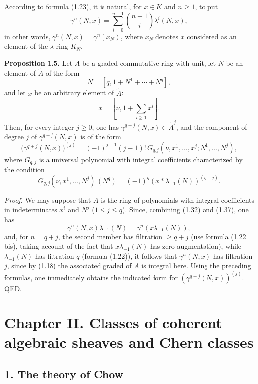 According to formula (1.23), it is natural, for $x\in K$ and $n\geq 1$, to put
\begin{equation}\tag{1.37}
\gamma^n(N,x)=\sum_{i=0}^{n-1}\binom{n-1}{i}\lambda^i(N,x),
\end{equation}
in other words, $\gamma^n(N,x)=\gamma^n(x_N)$, where $x_N$ denotes $x$ considered as an element of the $\lambda$-ring $K_N$.

\textbf{Proposition 1.5.} Let $A$ be a graded commutative ring with unit, let $N$ be an element of $\widetilde A$ of the form
\[
N=[q,1+N^1+\cdots+N^q],
\]
and let $x$ be an arbitrary element of $\widetilde A$:
\[
x=[\nu,1+\sum_{i\geq 1}x^i].
\]
Then, for every integer $j\geq 0$, one has $\gamma^{q+j}(N,x)\in\widetilde A^j$, and the component of degree $j$ of $\gamma^{q+j}(N,x)$ is of the form
\begin{equation}\tag{1.38}
\bigl(\gamma^{q+j}(N,x)\bigr)^{(j)}=(-1)^{j-1}(j-1)!\,G_{q,j}(\nu,x^1,\ldots,x^j;N^1,\ldots,N^j),
\end{equation}
where $G_{q,j}$ is a universal polynomial with integral coefficients characterized by the condition
\begin{equation}\tag{1.39}
G_{q,j}(\nu,x^1,\ldots,N^j)\,(N^q)=(-1)^q(x*\lambda_{-1}(N))^{(q+j)}.
\end{equation}

\emph{Proof.} We may suppose that $A$ is the ring of polynomials with integral coefficients in indeterminates $x^i$ and $N^j$ ($1\leq j\leq q$). Since, combining (1.32) and (1.37), one has
\begin{equation}\tag{1.40}
\gamma^n(N,x)\lambda_{-1}(N)=\gamma^n(x\lambda_{-1}(N)),
\end{equation}
and, for $n=q+j$, the second member has filtration $\geq q+j$ (use formula (1.22 bis), taking account of the fact that $x\lambda_{-1}(N)$ has zero augmentation), while $\lambda_{-1}(N)$ has filtration $q$ (formula (1.22)), it follows that $\gamma^n(N,x)$ has filtration $j$, since by (1.18) the associated graded of $A$ is integral here. Using the preceding formulas, one immediately obtains the indicated form for $(\gamma^{q+j}(N,x))^{(j)}$. QED.

\section*{Chapter II. Classes of coherent algebraic sheaves and Chern classes}

\subsection*{1. The theory of Chow}

